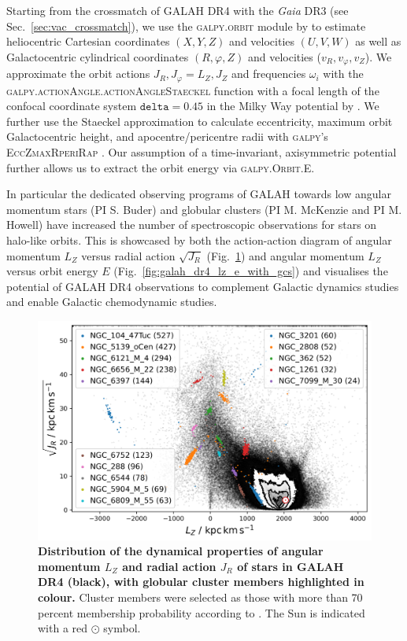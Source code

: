 \documentclass[
  journal=pasa,
  manuscript=research-paper, %
  year=2024,
  volume=37
]{cup-journal}
\newcommand{\Gaia}{\textit{Gaia}\xspace}
\begin{document}
Starting from the crossmatch of GALAH DR4 with the \Gaia DR3 (see Sec.~\ref{sec:vac_crossmatch}), we use the \textsc{galpy.orbit} module by \citet{Bovy2015} to estimate heliocentric Cartesian coordinates $(X,Y,Z)$ and velocities $(U,V,W)$ as well as Galactocentric cylindrical coordinates $(R, \varphi, Z)$ and velocities ($v_R, v_\varphi, v_Z$). We approximate the orbit actions $J_R, J_\varphi = L_Z, J_Z$ and frequencies $\omega_i$ with the \textsc{galpy.actionAngle.actionAngleStaeckel} function with a focal length of the confocal coordinate system $\texttt{delta} = 0.45$ in the Milky Way potential by \citet{McMillan2017}. We further use the Staeckel approximation \citep{Binney2012} to calculate eccentricity, maximum orbit Galactocentric height, and apocentre/pericentre radii with \textsc{galpy}'s \textsc{EccZmaxRperiRap} \citep{Mackereth2018}. Our assumption of a time-invariant, axisymmetric potential further allows us to extract the orbit energy via \textsc{galpy.Orbit.E}.

In particular the dedicated observing programs of GALAH towards low angular momentum stars (PI S. Buder) and globular clusters (PI M. McKenzie and PI M. Howell) have increased the number of spectroscopic observations for stars on halo-like orbits. This is showcased by both the action-action diagram of angular momentum $L_Z$ versus radial action $\sqrt{J_R}$ (Fig.~\ref{fig:galah_dr4_lz_jr_with_gcs}) and angular momentum $L_Z$ versus orbit energy $E$ (Fig.~\ref{fig:galah_dr4_lz_e_with_gcs}) and visualises the potential of GALAH DR4 observations to complement Galactic dynamics studies and enable Galactic chemodynamic studies.

\begin{figure}[ht]
\includegraphics[width=\columnwidth]{figures/galah_dr4_lz_jr_with_gcs.png}
\caption{
\textbf{Distribution of the dynamical properties of angular momentum $L_Z$ and radial action $J_R$ of stars in GALAH DR4 (black), with globular cluster members highlighted in colour.} Cluster members were selected as those with more than 70 percent membership probability according to \citet{Vasiliev2021}. The Sun is indicated with a red $\odot$ symbol.
}
\label{fig:galah_dr4_lz_jr_with_gcs}
\end{figure}
\end{document}
